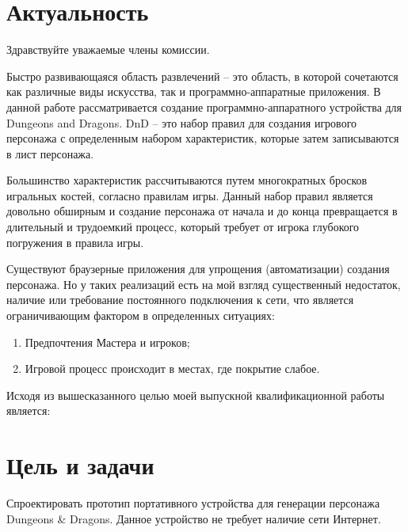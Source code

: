 \documentclass[12pt,a4paper]{article}
\begin{document}

\section{Актуальность}

Здравствуйте уважаемые члены комиссии.

Быстро развивающаяся область развлечений -- это область, в которой сочетаются как различные виды искусства, так и программно-аппаратные приложения. В данной работе рассматривается создание программно-аппаратного устройства для Dungeons and Dragons. DnD -- это набор правил для создания игрового персонажа с определенным набором характеристик, которые затем записываются в лист персонажа.

Большинство характеристик рассчитываются путем многократных бросков игральных костей, согласно правилам игры. Данный набор правил является довольно обширным и создание персонажа от начала и до конца превращается в длительный и трудоемкий процесс, который требует от игрока глубокого погружения в правила игры.


Существуют браузерные приложения для упрощения (автоматизации) создания персонажа. Но у таких реализаций есть на мой взгляд существенный недостаток, наличие или требование постоянного подключения к сети, что является ограничивающим фактором в определенных ситуациях:

\begin{enumerate}
    \item Предпочтения Мастера и игроков;
    \item Игровой процесс происходит в местах, где покрытие слабое.
\end{enumerate}

Исходя из вышесказанного целью моей выпускной квалификационной работы является: 

\section{Цель и задачи}


Спроектировать прототип портативного устройства для генерации персонажа Dungeons \& Dragons. Данное устройство не требует наличие сети Интернет.
\end{document}
